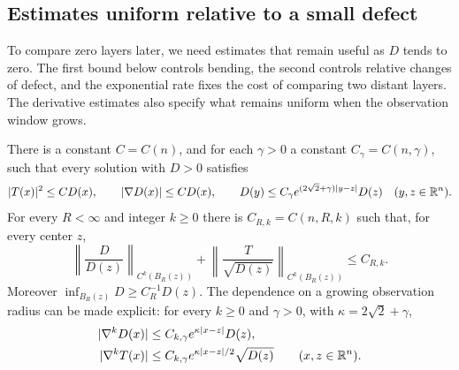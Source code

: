 \subsection{Estimates uniform relative to a small defect}

To compare zero layers later, we need estimates that remain useful as
$D$ tends to zero. The first bound below controls bending, the second
controls relative changes of defect, and the exponential rate fixes the
cost of comparing two distant layers. The derivative estimates also
specify what remains uniform when the observation window grows.

\begin{lemma}\label{lem:diffuse-local}
There is a constant $C=C(n)$, and for each $\gamma>0$ a constant
$C_\gamma=C(n,\gamma)$, such that every solution with $D>0$ satisfies
\begin{equation}\label{eq:diffuse-local}
 |T(x)|^2\le CD(x),\qquad |\nabla D(x)|\le CD(x),\qquad
 D(y)\le C_\gamma e^{(2\sqrt2+\gamma)|y-z|}D(z)
 \quad(y,z\in\mathbb R^n).
\end{equation}
For every $R<\infty$ and integer $k\ge0$ there is $C_{R,k}=C(n,R,k)$ such
that, for every center $z$,
\begin{equation}\label{eq:diffuse-normalized-bounds}
 \left\|\frac{D}{D(z)}\right\|_{C^k(B_R(z))}
 +\left\|\frac{T}{\sqrt{D(z)}}\right\|_{C^k(B_R(z))}
 \le C_{R,k}.
\end{equation}
Moreover $\inf_{B_R(z)}D\ge C_R^{-1}D(z)$.
The dependence on a growing observation radius can be made explicit:
for every $k\ge0$ and $\gamma>0$, with $\kappa=2\sqrt2+\gamma$,
\begin{equation}\label{eq:diffuse-derivative-growth}
 \begin{split}
 |\nabla^kD(x)|&\le C_{k,\gamma}e^{\kappa|x-z|}D(z),\\
 |\nabla^kT(x)|&\le C_{k,\gamma}e^{\kappa|x-z|/2}\sqrt{D(z)}
 \qquad(x,z\in\mathbb R^n).
 \end{split}
\end{equation}
\end{lemma}

